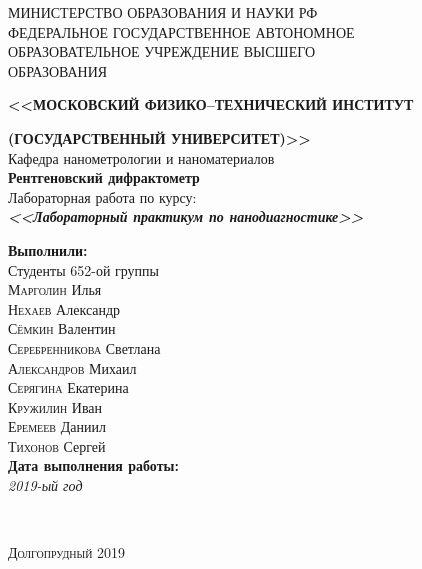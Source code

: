 \documentclass[a4paper]{article}
\begin{document}

\begin{center}
\hfill \break
\Large{МИНИСТЕРСТВО ОБРАЗОВАНИЯ И НАУКИ РФ}\\
\vspace{0.6cm}
\large{ФЕДЕРАЛЬНОЕ ГОСУДАРСТВЕННОЕ АВТОНОМНОЕ \\ 
    ОБРАЗОВАТЕЛЬНОЕ УЧРЕЖДЕНИЕ ВЫСШЕГО\\
    ОБРАЗОВАНИЯ}\\
\vspace{0.9cm}
\centerline{\Large{\textbf{<<МОСКОВСКИЙ ФИЗИКО--ТЕХНИЧЕСКИЙ ИНСТИТУТ}}}

\Large{\textbf{(ГОСУДАРСТВЕННЫЙ УНИВЕРСИТЕТ)>>}}\\
\vspace{1.3cm}
\large{\textsf{Кафедра нанометрологии и наноматериалов}}\\
\vspace{1.2cm}
\Huge{\textbf{Рентгеновский дифрактометр}}\\
\vspace{0.5cm}
\large{Лабораторная работа по курсу:}\\
\bfseries \itshape \Large{<<Лабораторный практикум по нанодиагностике>>} \large
\end{center}

\vspace{2.5cm}
\null\hfill
\begin{minipage}{0.44\textwidth}
\large\textbf{Выполнили:}\\
Студенты 652-ой группы\\
\textsc{Марголин} Илья\\
\textsc{Нехаев} Александр\\
\textsc{Сёмкин} Валентин\\
\textsc{Серебренникова} Светлана\\
\textsc{Александров} Михаил\\
\textsc{Серягина} Екатерина\\
\textsc{Кружилин} Иван\\
\textsc{Еремеев} Даниил\\
\textsc{Тихонов} Сергей\\


\textbf{Дата выполнения работы:}\\
\textit{2019-ый год}\\
\end{minipage}\\
\vfill
\begin{center} \textsc{Долгопрудный 2019} \end{center}
\thispagestyle{empty} %
\end{document}
